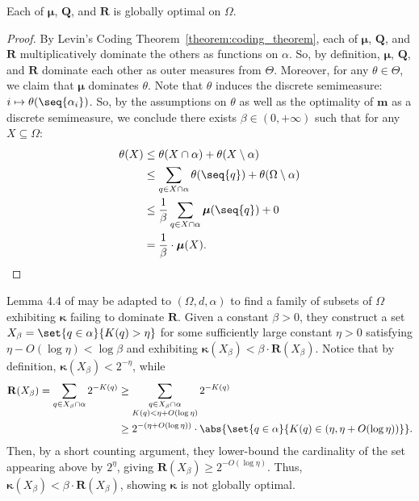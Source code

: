 \begin{proposition}
    \label{proposition:the_three_globally_optimal_outer_measures}
    Each of $\boldsymbol{\mu}$, $\mathbf{Q}$, and $\mathbf{R}$ is globally optimal on $\Omega$.
\end{proposition}
\begin{proof}
     By Levin's Coding Theorem~\ref{theorem:coding_theorem}, each of $\boldsymbol{\mu}$, $\mathbf{Q}$, and $\mathbf{R}$ multiplicatively dominate the others as functions on $\alpha$. So, by definition, $\boldsymbol{\mu}$, $\mathbf{Q}$, and $\mathbf{R}$ dominate each other as outer measures from $\Theta$. Moreover, for any $\theta \in \Theta$, we claim that $\boldsymbol{\mu}$ dominates $\theta$. Note that $\theta$ induces the discrete semimeasure: $i \mapsto \theta(\seq{\alpha_i})$. So, by the assumptions on $\theta$ as well as the optimality of $\mathbf{m}$ as a discrete semimeasure, we conclude there exists $\beta \in (0, +\infty)$ such that for any $X \subseteq \Omega$:
    \begin{align*}
        \theta(X) &\leq \theta(X \cap \alpha) + \theta(X \setminus \alpha)\\
        &\leq \sum_{q \in X \cap \alpha} \theta(\seq{q}) + \theta(\Omega \setminus \alpha)\\
        &\leq \frac{1}{\beta} \sum_{q \in X \cap \alpha} \boldsymbol{\mu}(\seq{q}) + 0\\
        &= \frac{1}{\beta} \cdot \boldsymbol{\mu}(X).
    \end{align*}
\end{proof}

Lemma 4.4 of \cite{LL20} may be adapted to $(\Omega, d, \alpha)$ to find a family of subsets of $\Omega$ exhibiting $\boldsymbol{\kappa}$ failing to dominate $\boldsymbol{R}$. Given a constant $\beta > 0$, they construct a set $X_\beta = \set{q \in \alpha}{K(q) > \eta}$ for some sufficiently large constant $\eta > 0$ satisfying $\eta - O(\log \eta) <\log \beta$ and exhibiting $\boldsymbol{\kappa}(X_\beta) < \beta \cdot \mathbf{R}(X_\beta)$. Notice that by definition, $\boldsymbol{\kappa}(X_\beta) < 2^{-\eta}$, while
\begin{align*}
    \mathbf{R}(X_\beta) = \sum_{q \in X_\beta \cap \alpha} 2^{-K(q)} &\geq \sum_{\substack{q \in X_\beta \cap \alpha\\K(q) < \eta + O(\log \eta)}} 2^{-K(q)}\\ 
    &\geq 2^{-(\eta + O(\log \eta))} \cdot \abs{\set{q \in \alpha}{K(q) \in (\eta, \eta + O(\log \eta))}}.
\end{align*}
Then, by a short counting argument, they lower-bound the cardinality of the set appearing above by $2^{\eta}$, giving $\mathbf{R}(X_\beta) \geq 2^{-O(\log \eta)}$. Thus, $\boldsymbol{\kappa}(X_\beta) < \beta \cdot \mathbf{R}(X_\beta)$, showing $\boldsymbol{\kappa}$ is not globally optimal.

